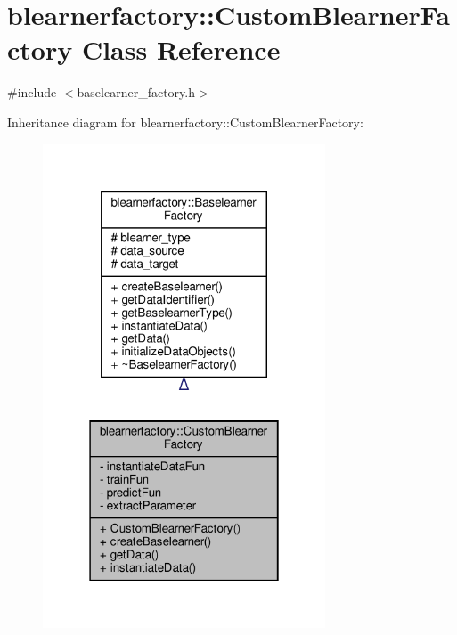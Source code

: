\hypertarget{classblearnerfactory_1_1_custom_blearner_factory}{}\section{blearnerfactory\+:\+:Custom\+Blearner\+Factory Class Reference}
\label{classblearnerfactory_1_1_custom_blearner_factory}


{\ttfamily \#include $<$baselearner\+\_\+factory.\+h$>$}



Inheritance diagram for blearnerfactory\+:\+:Custom\+Blearner\+Factory\+:\nopagebreak
\begin{figure}[H]
\begin{center}
\leavevmode
\includegraphics[width=238pt]{classblearnerfactory_1_1_custom_blearner_factory__inherit__graph}
\end{center}
\end{figure}


